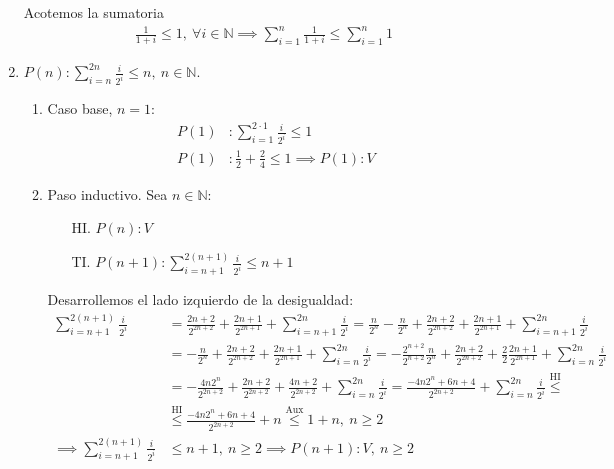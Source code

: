 \begin{enumerate}[label=\roman*)]
    Acotemos la sumatoria 
    \begin{align*}
        \frac{1}{1+i} \leq 1, \ \forall i \in \mathbb{N} \implies \sum_{i=1}^{n} \frac{1}{1+i} \leq \sum_{i=1}^{n} 1
    \end{align*}

    \item $P(n): \displaystyle \sum_{i=n}^{2n} \frac{i}{2^i} \leq n, \ n \in \mathbb{N}$.
    \begin{enumerate}[label=\arabic*)]
        \item Caso base, $n = 1$:
        \begin{align*}
            P(1)&: \sum_{i=1}^{2 \cdot 1} \frac{i}{2^i} \leq 1 \\
            P(1)&: \frac{1}{2} + \frac{2}{4} \leq 1 \implies P(1): V
        \end{align*}
        \item Paso inductivo. Sea $n \in \mathbb{N}$:
        \begin{enumerate}
            \item[HI.] $P(n): V$
            \item[TI.] $P(n+1): \displaystyle \sum_{i=n+1}^{2(n+1)} \frac{i}{2^i} \leq n+1$ 
        \end{enumerate}

        Desarrollemos el lado izquierdo de la desigualdad:
        \begin{align*}
            \sum_{i=n+1}^{2(n+1)} \frac{i}{2^i} &= \frac{2n+2}{2^{2n+2}} + \frac{2n+1}{2^{2n+1}} 
            + \sum_{i=n+1}^{2n} \frac{i}{2^i} = \frac{n}{2^n} - \frac{n}{2^n} + \frac{2n+2}{2^{2n+2}} 
            + \frac{2n+1}{2^{2n+1}} + \sum_{i=n+1}^{2n} \frac{i}{2^i} \\
            &= - \frac{n}{2^n} + \frac{2n+2}{2^{2n+2}} + \frac{2n+1}{2^{2n+1}} + \sum_{i=n}^{2n} \frac{i}{2^i} 
            = - \frac{2^{n+2}}{2^{n+2}}\frac{n}{2^n} + \frac{2n+2}{2^{2n+2}} + \frac{2}{2}\frac{2n+1}{2^{2n+1}} 
            + \sum_{i=n}^{2n} \frac{i}{2^i} \\
            &= - \frac{4n 2^n}{2^{2n+2}} + \frac{2n+2}{2^{2n+2}} + \frac{4n+2}{2^{2n+2}} 
            + \sum_{i=n}^{2n} \frac{i}{2^i} = \frac{-4n 2^n + 6n + 4}{2^{2n+2}} + \sum_{i=n}^{2n} \frac{i}{2^i} 
            \overset{\text{HI}}{\leq} \\
            &\overset{\text{HI}}{\leq} \frac{-4n 2^n + 6n + 4}{2^{2n+2}} + n 
            \overset{\text{Aux}}{\leq} 1 + n, \ n \geq 2 \\
            \implies \sum_{i=n+1}^{2(n+1)} \frac{i}{2^i} &\leq n + 1, \ n \geq 2 \implies P(n+1): V, \ n \geq 2
        \end{align*}


\end{enumerate}
\end{enumerate}
